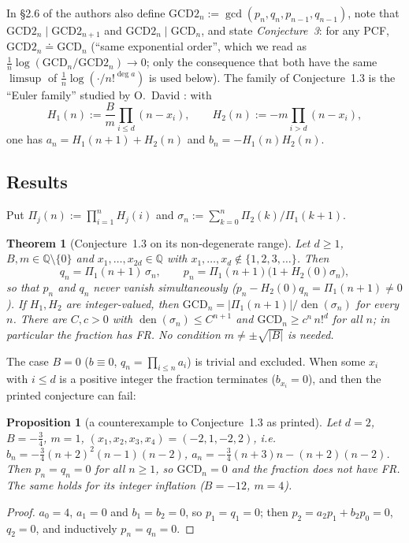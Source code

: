 \documentclass[11pt]{amsart}
\newtheorem{theorem}{Theorem}
\newtheorem{proposition}[lemma]{Proposition}
\theoremstyle{definition}
\theoremstyle{remark}
\numberwithin{equation}{section}
\newcommand{\Q}{\mathbb{Q}}
\newcommand{\GCD}{\mathrm{GCD}}
\newcommand{\den}{\operatorname{den}}
\begin{document}
In \S2.6 of \cite{BDNM} the authors also define $\GCD2_n:=\gcd(p_n,q_n,p_{n-1},q_{n-1})$, note that $\GCD2_n\mid\GCD2_{n+1}$ and $\GCD2_n\mid\GCD_n$, and state \emph{Conjecture~3}: for any PCF, $\GCD2_n\doteq\GCD_n$ (``same exponential order'', which we read as $\frac1n\log(\GCD_n/\GCD2_n)\to0$; only the consequence that both have the same $\limsup$ of $\frac1n\log(\cdot/n!^{\deg a})$ is used below). The family of Conjecture~1.3 is the ``Euler family'' studied by O.~David \cite{Dav}: with
\[
H_1(n):=\frac Bm\prod_{i\le d}(n-x_i),\qquad H_2(n):=-m\prod_{i>d}(n-x_i),
\]
one has $a_n=H_1(n+1)+H_2(n)$ and $b_n=-H_1(n)H_2(n)$.

\subsection{Results}
Put $\Pi_j(n):=\prod_{i=1}^nH_j(i)$ and $\sigma_n:=\sum_{k=0}^n\Pi_2(k)/\Pi_1(k+1)$.

\begin{theorem}[Conjecture~1.3 on its non-degenerate range]\label{thm:A}
Let $d\ge1$, $B,m\in\Q\setminus\{0\}$ and $x_1,\dots,x_{2d}\in\Q$ with $x_1,\dots,x_d\notin\{1,2,3,\dots\}$. Then
\[
q_n=\Pi_1(n+1)\,\sigma_n,\qquad p_n=\Pi_1(n+1)\bigl(1+H_2(0)\sigma_n\bigr),
\]
so that $p_n$ and $q_n$ never vanish simultaneously ($p_n-H_2(0)q_n=\Pi_1(n+1)\neq0$). If $H_1,H_2$ are integer-valued, then $\GCD_n=|\Pi_1(n+1)|/\den(\sigma_n)$ for every $n$. There are $C,c>0$ with $\den(\sigma_n)\le C^{n+1}$ and $\GCD_n\ge c^n\,n!^d$ for all $n$; in particular the fraction has FR. No condition $m\neq\pm\sqrt{|B|}$ is needed.
\end{theorem}

The case $B=0$ ($b\equiv0$, $q_n=\prod_{i\le n}a_i$) is trivial and excluded. When some $x_i$ with $i\le d$ is a positive integer the fraction terminates ($b_{x_i}=0$), and then the printed conjecture can fail:

\begin{proposition}[a counterexample to Conjecture~1.3 as printed]\label{prop:counter}
Let $d=2$, $B=-\frac34$, $m=1$, $(x_1,x_2,x_3,x_4)=(-2,1,-2,2)$, i.e.\ $b_n=-\frac34(n+2)^2(n-1)(n-2)$, $a_n=-\frac34(n+3)n-(n+2)(n-2)$. Then $p_n=q_n=0$ for all $n\ge1$, so $\GCD_n=0$ and the fraction does not have FR. The same holds for its integer inflation ($B=-12$, $m=4$).
\end{proposition}
\begin{proof}
$a_0=4$, $a_1=0$ and $b_1=b_2=0$, so $p_1=q_1=0$; then $p_2=a_2p_1+b_2p_0=0$, $q_2=0$, and inductively $p_n=q_n=0$.
\end{proof}
\end{document}
